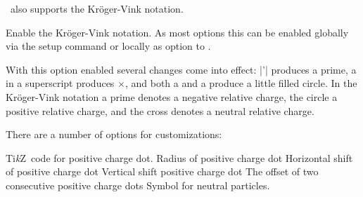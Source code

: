 \documentclass[load-preamble+]{cnltx-doc}
\newcommand*\TikZ{Ti\textit{k}Z}
\begin{document}
\chemformula\ also supports the Kröger-Vink notation.
\begin{options}
    Enable the Kröger-Vink notation. As most options this can be enabled
    globally via the setup command or locally as option to .
\end{options}

With this option enabled several changes come into effect: \verbcode|'|
produces a prime, a  in a superscript produces $\times$, and both a
 and a \code{*} produce a little filled circle. In the Kröger-Vink
notation a prime denotes a negative relative charge, the circle a positive
relative charge, and the cross denotes a neutral relative charge.

\begin{example}[side-by-side,add-sourcecode-options={literate=}]
  \par
  \par
  \par
  \par
  \par
  \par
\end{example}

There are a number of options for customizations:
\begin{options}
  \keyval{kv-positive-style}{\TikZ}\Default
    \TikZ\ code for positive charge dot.
  \Default{.3ex}
    Radius of positive charge dot
  \Default{.15em}
    Horizontal shift of positive charge dot
  \Default{.5ex}
    Vertical shift positive charge dot
  \Default{.4em}
    The offset of two consecutive positive charge dots
    Symbol for neutral particles.
\end{options}




\end{document}

